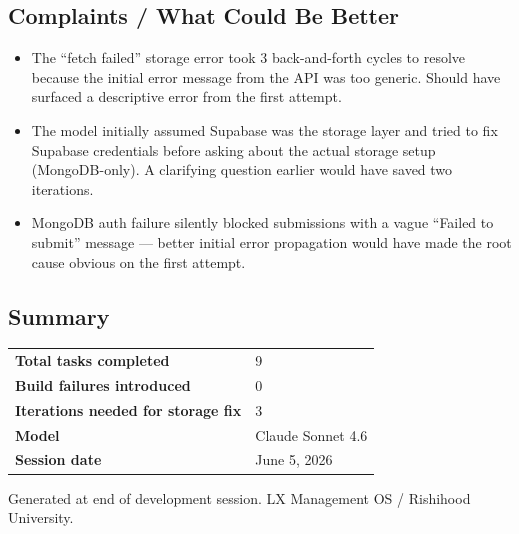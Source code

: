 \documentclass[11pt, a4paper]{article}
\begin{document}
\subsection{Complaints / What Could Be Better}
\begin{itemize}
    \item The ``fetch failed'' storage error took 3 back-and-forth cycles to resolve because
          the initial error message from the API was too generic. Should have surfaced a
          descriptive error from the first attempt.
    \item The model initially assumed Supabase was the storage layer and tried to fix
          Supabase credentials before asking about the actual storage setup (MongoDB-only).
          A clarifying question earlier would have saved two iterations.
    \item MongoDB auth failure silently blocked submissions with a vague ``Failed to submit''
          message — better initial error propagation would have made the root cause obvious
          on the first attempt.
\end{itemize}

\subsection{Summary}
\begin{center}
\begin{tabular}{ll}
\toprule
\textbf{Total tasks completed} & 9 \\
\textbf{Build failures introduced} & 0 \\
\textbf{Iterations needed for storage fix} & 3 \\
\textbf{Model} & Claude Sonnet 4.6 \\
\textbf{Session date} & June 5, 2026 \\
\bottomrule
\end{tabular}
\end{center}

\vspace{2em}
\noindent\textcolor{muted}{\small Generated at end of development session. LX Management OS / Rishihood University.}
\end{document}
